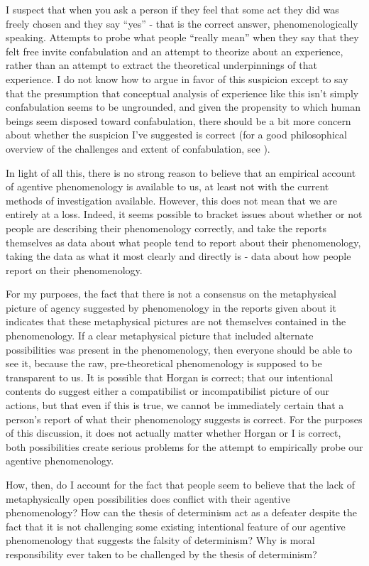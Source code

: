 \documentclass[phd,12pt,oneside,paper=letterpaper]{ubcthesis}
\begin{document}
I suspect that when you ask a person if they feel that some act they did was freely chosen and they say ``yes'' - that is the correct answer, phenomenologically speaking. Attempts to probe what people ``really mean'' when they say that they felt free invite confabulation and an attempt to theorize about an experience, rather than an attempt to extract the theoretical underpinnings of that experience. I do not know how to argue in favor of this suspicion except to say that the presumption that conceptual analysis of experience like this isn't simply confabulation seems to be ungrounded, and given the propensity to which human beings seem disposed toward confabulation, there should be a bit more concern about whether the suspicion I've suggested is correct (for a good philosophical overview of the challenges and extent of confabulation, see \citep{hirstein2005}). 

In light of all this, there is no strong reason to believe that an empirical account of agentive phenomenology is available to us, at least not with the current methods of investigation available. However, this does not mean that we are entirely at a loss. Indeed, it seems possible to bracket issues about whether or not people are describing their phenomenology correctly, and take the reports themselves as data about what people tend to report about their phenomenology, taking the data as what it most clearly and directly is - data about how people report on their phenomenology.

For my purposes, the fact that there is not a consensus on the metaphysical picture of agency suggested by phenomenology in the reports given about it indicates that these metaphysical pictures are not themselves contained in the phenomenology. If a clear metaphysical picture that included alternate possibilities was present in the phenomenology, then everyone should be able to see it, because the raw, pre-theoretical phenomenology is supposed to be transparent to us. It is possible that Horgan is correct; that our intentional contents do suggest either a compatibilist or incompatibilist picture of our actions, but that even if this is true, we cannot be immediately certain that a person's report of what their phenomenology suggests is correct. For the purposes of this discussion, it does not actually matter whether Horgan or I is correct, both possibilities create serious problems for the attempt to empirically probe our agentive phenomenology. 

How, then, do I account for the fact that people seem to believe that the lack of metaphysically open possibilities does conflict with their agentive phenomenology? How can the thesis of determinism act as a defeater despite the fact that it is not challenging some existing intentional feature of our agentive phenomenology that suggests the falsity of determinism? Why is moral responsibility ever taken to be challenged by the thesis of determinism?
\end{document}
